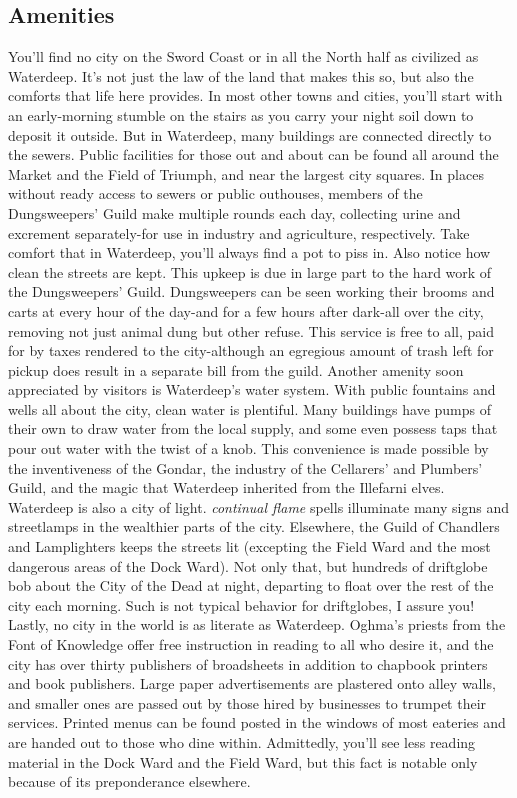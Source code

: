 \documentclass[10pt,a4paper,twoside,twocolumn,openany,nodeprecatedcode]{dndbook}
\begin{document}
\subsection{Amenities}
You'll find no city on the Sword Coast or in all the North half as civilized as Waterdeep. It's not just the law of the land that makes this so, but also the comforts that life here provides.
In most other towns and cities, you'll start with an early-morning stumble on the stairs as you carry your night soil down to deposit it outside. But in Waterdeep, many buildings are connected directly to the sewers. Public facilities for those out and about can be found all around the Market and the Field of Triumph, and near the largest city squares. In places without ready access to sewers or public outhouses, members of the Dungsweepers' Guild make multiple rounds each day, collecting urine and excrement separately-for use in industry and agriculture, respectively. Take comfort that in Waterdeep, you'll always find a pot to piss in.
Also notice how clean the streets are kept. This upkeep is due in large part to the hard work of the Dungsweepers' Guild. Dungsweepers can be seen working their brooms and carts at every hour of the day-and for a few hours after dark-all over the city, removing not just animal dung but other refuse. This service is free to all, paid for by taxes rendered to the city-although an egregious amount of trash left for pickup does result in a separate bill from the guild.
Another amenity soon appreciated by visitors is Waterdeep's water system. With public fountains and wells all about the city, clean water is plentiful. Many buildings have pumps of their own to draw water from the local supply, and some even possess taps that pour out water with the twist of a knob. This convenience is made possible by the inventiveness of the Gondar, the industry of the Cellarers' and Plumbers' Guild, and the magic that Waterdeep inherited from the Illefarni elves.
Waterdeep is also a city of light. \textit{continual flame} spells illuminate many signs and streetlamps in the wealthier parts of the city. Elsewhere, the Guild of Chandlers and Lamplighters keeps the streets lit (excepting the Field Ward and the most dangerous areas of the Dock Ward). Not only that, but hundreds of driftglobe bob about the City of the Dead at night, departing to float over the rest of the city each morning. Such is not typical behavior for driftglobes, I assure you!
Lastly, no city in the world is as literate as Waterdeep. Oghma's priests from the Font of Knowledge offer free instruction in reading to all who desire it, and the city has over thirty publishers of broadsheets in addition to chapbook printers and book publishers. Large paper advertisements are plastered onto alley walls, and smaller ones are passed out by those hired by businesses to trumpet their services. Printed menus can be found posted in the windows of most eateries and are handed out to those who dine within. Admittedly, you'll see less reading material in the Dock Ward and the Field Ward, but this fact is notable only because of its preponderance elsewhere.
\end{document}
